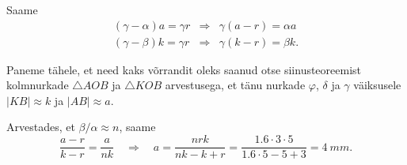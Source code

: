 Saame
\[
\begin{array}{lll}{(\gamma-\alpha) a=\gamma r} & {\Rightarrow} & {\gamma(a-r)=\alpha a} \\ {(\gamma-\beta) k=\gamma r} & {\Rightarrow} & {\gamma(k-r)=\beta k.}\end{array}
\]

Paneme tähele, et need kaks võrrandit oleks saanud otse siinusteoreemist kolmnurkade $\triangle AOB$ ja $\triangle KOB$ arvestusega, et tänu nurkade $\varphi$, $\delta$ ja $\gamma$ väiksusele $|KB| \approx k$ ja $|AB| \approx a$.

Arvestades, et $\beta /\alpha \approx n$, saame
\[
\frac{a-r}{k-r}=\frac{a}{n k} \quad \Rightarrow \quad a=\frac{n r k}{n k-k+r}=\frac{\num{1,6} \cdot \num{3} \cdot \num{5}}{\num{1,6} \cdot \num{5}-\num{5}+\num{3}}=\SI{4}{mm}.
\]
\probend